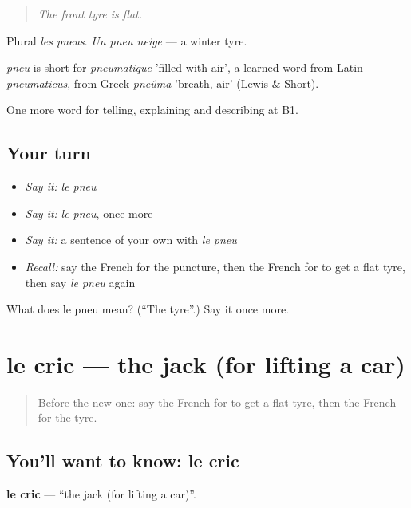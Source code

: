 \begin{quote}
\emph{The front tyre is flat.}
\end{quote}

Plural \emph{les pneus}. \emph{Un pneu neige} — a winter tyre.

\begin{cousinweb}
\emph{pneu} is short for \emph{pneumatique} 'filled with air', a learned word from Latin \emph{pneumaticus}, from Greek \emph{pneûma} 'breath, air' (Lewis \& Short).
\end{cousinweb}

\begin{grammarlens}[title={What you've built}]
One more word for telling, explaining and describing at B1.
\end{grammarlens}

\subsection*{Your turn}
\begin{itemize}
\raggedright
  \item \emph{Say it:} \emph{le pneu}
  \item \emph{Say it:} \emph{le pneu}, once more
  \item \emph{Say it:} a sentence of your own with \emph{le pneu}
  \item \emph{Recall:} say the French for the puncture, then the French for to get a flat tyre, then say \emph{le pneu} again
\end{itemize}

\begin{tcolorbox}[breakable,colback=teal!4,colframe=teal!35!black,title={Before you move on}]
What does le pneu mean? (\textquotedblleft{}The tyre\textquotedblright{}.) Say it once more.
\end{tcolorbox}
\section[le cric]{le cric — the jack (for lifting a car)}

\label{lesson:FR-C404-cric}



\begin{quote}
Before the new one: say the French for to get a flat tyre, then the French for the tyre.
\end{quote}

\subsection*{You'll want to know: le cric}
\textbf{le cric} — \textquotedblleft{}the jack (for lifting a car)\textquotedblright{}.

